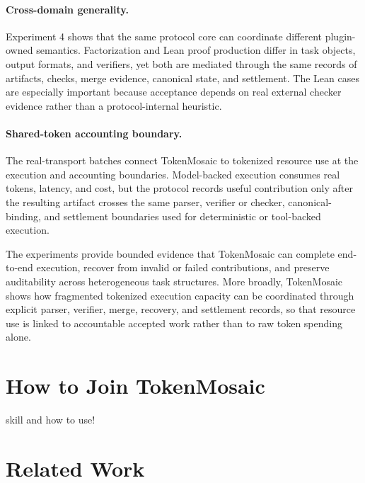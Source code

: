 \documentclass{article}
\theoremstyle{plain}
\begin{document}
\paragraph{Cross-domain generality.} Experiment 4 shows that the same protocol core can coordinate different plugin-owned semantics. Factorization and Lean proof production differ in task objects, output formats, and verifiers, yet both are mediated through the same records of artifacts, checks, merge evidence, canonical state, and settlement. The Lean cases are especially important because acceptance depends on real external checker evidence rather than a protocol-internal heuristic.

\paragraph{Shared-token accounting boundary.} The real-transport batches connect TokenMosaic to tokenized resource use at the execution and accounting boundaries. Model-backed execution consumes real tokens, latency, and cost, but the protocol records useful contribution only after the resulting artifact crosses the same parser, verifier or checker, canonical-binding, and settlement boundaries used for deterministic or tool-backed execution.

The experiments provide bounded evidence that TokenMosaic can complete end-to-end execution, recover from invalid or failed contributions, and preserve auditability across heterogeneous task structures. More broadly, TokenMosaic shows how fragmented tokenized execution capacity can be coordinated through explicit parser, verifier, merge, recovery, and settlement records, so that resource use is linked to accountable accepted work rather than to raw token spending alone.
\normalcolor



\section{How to Join TokenMosaic}

skill and how to use!



\section{Related Work}
\end{document}
